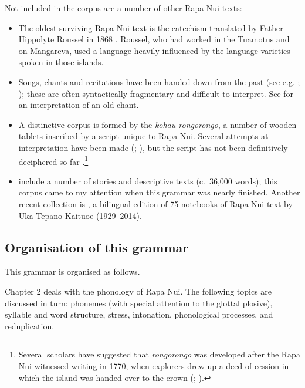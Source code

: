 Not included in the corpus are a number of other Rapa Nui texts:

\begin{itemize}
\item 
The oldest surviving Rapa Nui text is the catechism translated by Father Hippolyte Roussel in 1868 \citep{Roussel1995}. Roussel, who had worked in the Tuamotus and on Mangareva, used a language heavily influenced by the language varieties spoken in those islands.

\item 
Songs, chants and recitations have been handed down from the past (see e.g. \citealt{Campbell1970}; \citealt{Barthel1960}); these are often syntactically fragmentary and difficult to interpret. See \citet{Fischer1994} for an interpretation of an old chant.

\item 
A distinctive corpus is formed by the \textit{kōhau rongorongo}, a number of wooden tablets inscribed by a script unique to Rapa Nui. Several attempts at interpretation have been made (\citealt{Barthel1958}; \citealt{Fischer1997}), but the script has not been definitively deciphered so far \citep{Davletshin2012}.\footnote{\label{fn:30}Several scholars have suggested that \textit{rongorongo} was developed after the Rapa Nui witnessed writing in 1770, when  explorers drew up a deed of cession in which the island was handed over to the  crown (\citealt{Emory1972}; \citealt{Fischer1996Reply,Fischer1997}).}

\item 
\citet{GleisnerMontt2014} include a number of stories and descriptive texts (c.~36,000 words); this corpus came to my attention when this grammar was nearly finished. Another recent collection is \citet{TepanoKaituoe2015}, a bilingual edition of 75 notebooks of Rapa Nui text by Uka Tepano Kaituoe (1929–2014).

\end{itemize}
\subsection{Organisation of this grammar}\label{sec:1.6.3}

This grammar is organised as follows.

Chapter 2 deals with the phonology of Rapa Nui. The following topics are discussed in turn: phonemes (with special attention to the glottal plosive), syllable and word structure, stress, intonation, phonological processes, and reduplication. 

